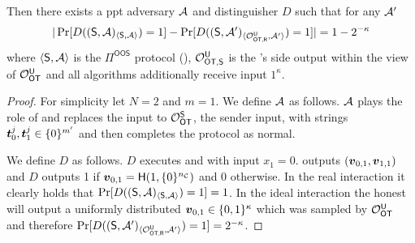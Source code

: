 \begin{lemma} 
	Then there exists a ppt adversary $\Adv$ and distinguisher $D$ such that for any $\Adv'$ 
	$$
	|\Pr[D((\send, \Adv)_{\langle\send, \Adv\rangle})=1]-\Pr[D((\send, \Adv')_{\langle\O^{\U}_{\textsf{OT,\rec}}, \Adv'\rangle})=1]|=1-2^{-\kappa}
	$$
	where $\langle\send, \Adv\rangle$ is the $\Pi^{\textsf{OOS}}$ protocol (), $\O^{\U}_{\textsf{OT,\send}}$ is the \rec's side output within the view of $\OOT^{\U}$ and all algorithms additionally receive input $1^\kappa$. 
\end{lemma}
\begin{proof}
	For simplicity let $N=2$ and $m=1$. We define $\Adv$ as follows. $\Adv$ plays the role of \rec and replaces the input to $\OOT^\send$, the sender input, with strings $\tt_0^j,\tt_1^j\in \{0\}^{m'}$ and then completes the protocol as normal.
	
	We define $D$ as follows. $D$ executes \send and \Adv with input $x_1=0$. \send outputs $(\vv_{0,1},\vv_{1,1})$ and $D$ outputs 1 if $\vv_{0,1}=\H(1, \{0\}^\nc)$ and 0 otherwise. In the real interaction it clearly holds that $\Pr[D((\send, \Adv)_{\langle\send, \Adv\rangle})=1]=1$. In the ideal interaction the honest \send will output a uniformly distributed $\vv_{0,1}\in\{0,1\}^\kappa$ which was sampled by $\OOT^{\U}$ and therefore $\Pr[D((\send, \Adv')_{\langle\O^{\U}_{\textsf{OT,\rec}}, \Adv'\rangle})=1]=2^{-\kappa}$.
\end{proof}



